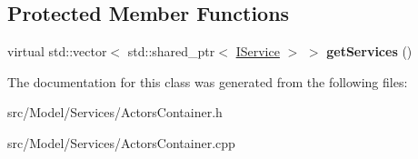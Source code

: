 \subsection*{Protected Member Functions}
\begin{DoxyCompactItemize}
\item 
virtual std\+::vector$<$ std\+::shared\+\_\+ptr$<$ \hyperlink{classIService}{I\+Service} $>$ $>$ {\bfseries get\+Services} ()\hypertarget{classActorsContainer_a13b62950aa6b619061b0b3e120d4811a}{}\label{classActorsContainer_a13b62950aa6b619061b0b3e120d4811a}

\end{DoxyCompactItemize}


The documentation for this class was generated from the following files\+:\begin{DoxyCompactItemize}
\item 
src/\+Model/\+Services/Actors\+Container.\+h\item 
src/\+Model/\+Services/Actors\+Container.\+cpp\end{DoxyCompactItemize}
